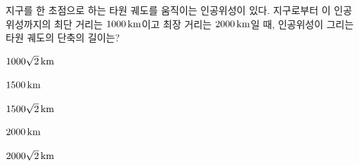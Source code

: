 지구를 한 초점으로 하는 타원 궤도를 움직이는 인공위성이 있다. 지구로부터 이 인공위성까지의 최단 거리는 $1000\mkern3mu \mathrm{km}$이고 최장 거리는 $2000\mkern3mu \mathrm{km}$일 때, 인공위성이 그리는 타원 궤도의 단축의 길이는? 
\begin{choices32}{\rule[-3ex]{0pt}{8ex}$1000\sqrt{2}\mkern3mu \mathrm{km}$}{\rule[-3ex]{0pt}{8ex}$1500\mkern3mu \mathrm{km}$}{\rule[-3ex]{0pt}{8ex}$1500\sqrt{2}\mkern3mu \mathrm{km}$}{\rule[-3ex]{0pt}{8ex}$2000\mkern3mu \mathrm{km}$}{\rule[-3ex]{0pt}{8ex}$2000\sqrt{2}\mkern3mu \mathrm{km}$}\end{choices32}
